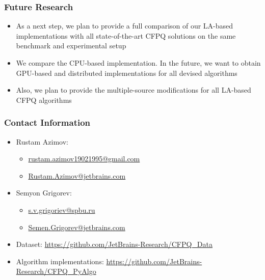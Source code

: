 \documentclass[xcolor=table,aspectratio=169]{beamer}
\begin{document}
\begin{frame}[fragile] \frametitle{Future Research}
  \begin{itemize}
  	\item As a next step, we plan to provide a full comparison of our LA-based implementations with all state-of-the-art CFPQ solutions on the same benchmark and experimental setup
  	\item We compare the CPU-based implementation. In the future, we
  	want to obtain GPU-based and distributed implementations for all devised algorithms
    \item Also, we plan to provide the multiple-source
    modifications for all LA-based CFPQ algorithms
\end{itemize}
\end{frame}

\begin{frame}
\frametitle{Contact Information}
\begin{itemize}
  \item Rustam Azimov:
  \begin{itemize}
  	\item \href{mailto:rustam.azimov19021995@gmail.com}{rustam.azimov19021995@gmail.com}
  	\item \href{mailto:Rustam.Azimov@jetbrains.com}{Rustam.Azimov@jetbrains.com}
  \end{itemize}
\item Semyon Grigorev:
\begin{itemize}
	\item \href{mailto:s.v.grigoriev@spbu.ru}{s.v.grigoriev@spbu.ru}
	\item \href{mailto:Semen.Grigorev@jetbrains.com}{Semen.Grigorev@jetbrains.com}
\end{itemize}
\vspace{0.5cm}
  \item Dataset: \href{https://github.com/JetBrains-Research/CFPQ_Data}{https://github.com/JetBrains-Research/CFPQ\_Data}
   \item Algorithm implementations: \href{https://github.com/JetBrains-Research/CFPQ_PyAlgo}{https://github.com/JetBrains-Research/CFPQ\_PyAlgo}
\end{itemize}
\vspace{0.1cm}
\end{frame}
\end{document}
